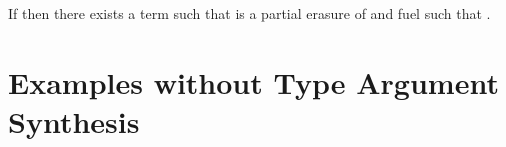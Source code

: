 \begin{lemma}
  If \ltitSdjudgement{\ltiEnv{}}
                     {\ltiE{}}
                     {\ltiT{}}
                     {\ltiEp{}}
                     then
    there exists a term \ltiF{} such that \ltiE{} is a partial erasure of \ltiF{}
    and fuel \ltiFuel{}
    such that
    \ltitSstkjudgementNoElab{\ltimakeCombinedThreadedEnv{\ltiFuel{}}{\ltiEmptyClosureCache}}
                      {\ltiEnv{}}
                      {\ltiF{}}
                      {\ltiT{}}
                      {\ltimakeCombinedThreadedEnv{\ltiFuelp{}}{\ltiClosureCache{}}}
                      {\ltiFp{}}.
\end{lemma}

\section{Examples without Type Argument Synthesis}

